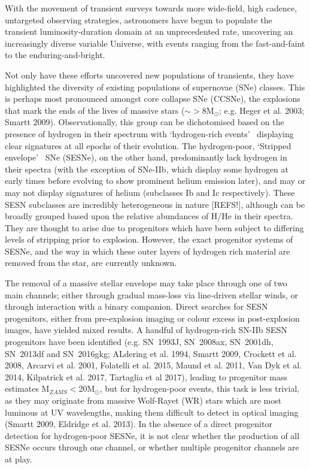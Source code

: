 \documentclass[a4paper,fleqn,usenatbib]{mnras}
\newcommand{\angus}[1]{\color{JungleGreen}#1\color{black}}
\begin{document}
With the movement of transient surveys towards more wide-field, high cadence, untargeted observing strategies, astronomers have begun to populate the transient luminosity-duration domain at an unprecedented rate, uncovering an increasingly diverse variable Universe, with events ranging from the fast-and-faint to the enduring-and-bright. 

Not only have these efforts uncovered new populations of transients, they have highlighted the diversity of existing populations of supernovae (SNe) classes. This is perhaps most pronounced amongst core collapse SNe (CCSNe), the explosions that mark the ends of the lives of massive stars ($\sim>$8M$_{\odot}$; e.g. {\angus{Heger et al. 2003; Smartt 2009}}). Observationally, this group can be dichotomised based on the presence of hydrogen in their spectrum with \lq hydrogen-rich events\rq~ displaying clear signatures at all epochs of their evolution. The hydrogen-poor, \lq Stripped envelope\rq~ SNe (SESNe), on the other hand, predominantly lack hydrogen in their spectra (with the exception of SNe-IIb, which display some hydrogen at early times before evolving to show prominent helium emission later), and may or may not display signatures of helium (subclasses Ib and Ic respectively). These SESN subclasses are incredibly heterogeneous in nature {\angus{[REFS!]}}, although can be broadly grouped based upon the relative abundances of H/He in their spectra. They are thought to arise due to progenitors which have been subject to differing levels of stripping prior to explosion. However, the exact progenitor systems of SESNe, and the way in which these outer layers of hydrogen rich material are removed from the star, are currently unknown. 

The removal of a massive stellar envelope may take place through one of two main channels; either through gradual mass-loss via line-driven stellar winds, or through interaction with a binary companion. Direct searches for SESN progenitors, either from pre-explosion imaging or colour excess in post-explosion images, have yielded mixed results. A handful of hydrogen-rich SN-IIb SESN progenitors have been identified {\angus
{(e.g. SN~1993J, SN~2008ax, SN~2001dh, SN~2013df and SN~2016gkg; ALdering et al. 1994, Smartt 2009, Crockett et al. 2008, Arcarvi et al. 2001, Folatelli et al. 2015, Maund et al. 2011, Van Dyk et al. 2014, Kilpatrick et al. 2017, Tartaglia et al 2017)}}, leading to progenitor mass estimates M$_{ZAMS}<$20M$_{\odot}$, but for hydrogen-poor events, this task is less trivial, as they may originate from massive Wolf-Rayet (WR) stars which are most luminous at UV wavelengths, making them difficult to detect in optical imaging {\angus{(Smartt 2009, Eldridge et al. 2013)}}. In the absence of a direct progenitor detection for hydrogen-poor SESNe, it is not clear whether the production of all SESNe occurs through one channel, or whether multiple progenitor channels are at play.
\end{document}
